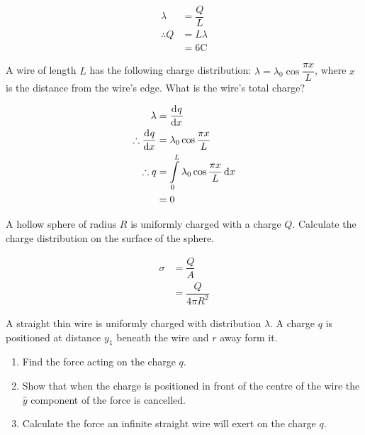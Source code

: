 \documentclass[fleqn, a4paper, 12pt, twoside]{article}
\theoremstyle{definition}
\theoremstyle{theorem}
\begin{document}
\begin{solution}[print]
	\begin{align*}
		\lambda &= \dfrac{Q}{L}\\
		\therefore Q &= L \lambda\\
		&= 6 \si{\coulomb}
	\end{align*}
\end{solution}

\begin{question}
	A wire of length $L$ has the following charge distribution: $\lambda = \lambda_0 \cos \dfrac{\pi x}{L}$, where $x$ is the distance from the wire's edge. What is the wire's total charge?
\end{question}

\begin{solution}[print]
	\begin{align*}
		\lambda &= \dod{q}{x}\\
		\therefore \dod{q}{x} &= \lambda_0 \cos \dfrac{\pi x}{L}\\
		\therefore q &= \int\limits_{0}^{L} \lambda_0 \cos \dfrac{\pi x}{L} \dif x\\
		&= 0
	\end{align*}
\end{solution}

\begin{question}
	A hollow sphere of radius $R$ is uniformly charged with a charge $Q$. Calculate the charge distribution on the surface of the sphere.
\end{question}

\begin{solution}[print]
	\begin{align*}
		\sigma &= \dfrac{Q}{A}\\
		&= \dfrac{Q}{4 \pi R^2}
	\end{align*}
\end{solution}

\begin{question}
	A straight thin wire is uniformly charged with distribution $\lambda$. A charge $q$ is positioned at distance $y_1$ beneath the wire and $r$ away form it.
	\begin{enumerate}
		\item Find the force acting on the charge $q$.
		\item Show that when the charge is positioned in front of the centre of the wire the $\hat{y}$ component of the force is cancelled.
		\item Calculate the force an infinite straight wire will exert on the charge $q$.
	\end{enumerate}
\end{question}
\end{document}
